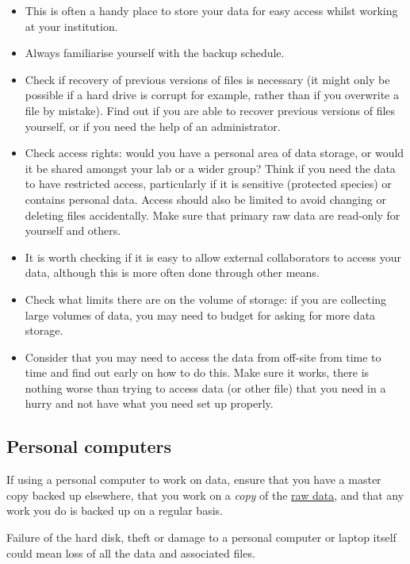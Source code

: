 \documentclass[a4paper,oneside]{report}
\providecommand{\tightlist}{%
  \setlength{\itemsep}{0pt}\setlength{\parskip}{0pt}}
\begin{document}
\begin{itemize}
\tightlist
\item
  This is often a handy place to store your data for easy access whilst
  working at your institution.
\item
  Always familiarise yourself with the backup schedule.
\item
  Check if recovery of previous versions of files is necessary (it might
  only be possible if a hard drive is corrupt for example, rather than
  if you overwrite a file by mistake). Find out if you are able to
  recover previous versions of files yourself, or if you need the help
  of an administrator.
\item
  Check access rights: would you have a personal area of data storage,
  or would it be shared amongst your lab or a wider group? Think if you
  need the data to have restricted access, particularly if it is
  sensitive (protected species) or contains personal data. Access should
  also be limited to avoid changing or deleting files accidentally. Make
  sure that primary raw data are read-only for yourself and others.
\item
  It is worth checking if it is easy to allow external collaborators to
  access your data, although this is more often done through other
  means.
\item
  Check what limits there are on the volume of storage: if you are
  collecting large volumes of data, you may need to budget for asking
  for more data storage.
\item
  Consider that you may need to access the data from off-site from time
  to time and find out early on how to do this. Make sure it works,
  there is nothing worse than trying to access data (or other file) that
  you need in a hurry and not have what you need set up properly.
\end{itemize}

\hypertarget{personal-computers}{%
\subsection{Personal computers}\label{personal-computers}}

If using a personal computer to work on data, ensure that you have a
master copy backed up elsewhere, that you work on a \emph{copy} of the
\protect\hyperlink{working-on-your-data}{raw data}, and that any work
you do is backed up on a regular basis.

Failure of the hard disk, theft or damage to a personal computer or
laptop itself could mean loss of all the data and associated files.
\end{document}
